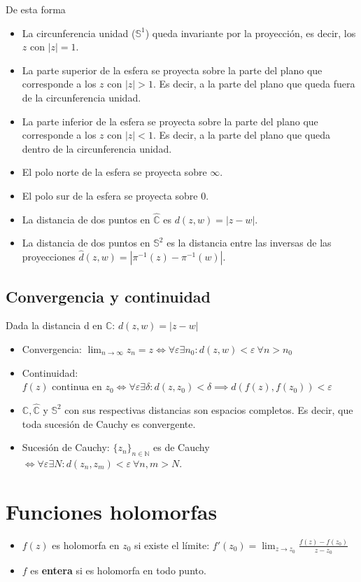 \documentclass[paper=a4, fontsize=11pt]{scrartcl}
\numberwithin{equation}{section}
\numberwithin{figure}{section}
\numberwithin{table}{section}
\begin{document}
De esta forma
\begin{itemize}
\item La circunferencia unidad ($\mathbb{S}^1$) queda invariante por la proyección, es decir, los $z$ con $|z|=1$.
\item La parte superior de la esfera se proyecta sobre la parte del plano que corresponde a los $z$ con $|z|>1$. Es decir, a la parte del plano que queda fuera de la circunferencia unidad.
\item La parte inferior de la esfera se proyecta sobre la parte del plano que corresponde a los $z$ con $|z|<1$. Es decir, a la parte del plano que queda dentro de la circunferencia unidad.
\item El polo norte de la esfera se proyecta sobre $\infty$.
\item El polo sur de la esfera se proyecta sobre $0$.
\item La distancia de dos puntos en $\hat{\mathbb{C}}$ es $d(z,w)=|z-w|$.
\item La distancia de dos puntos en $\mathbb{S}^2$ es la distancia entre las inversas de las proyecciones $\hat{d}(z,w)=|\pi^{-1}(z)-\pi^{-1}(w)|$.
\end{itemize}

\newpage
\subsection{Convergencia y continuidad}
Dada la distancia d en $\mathbb{C}$: $d(z,w)=|z-w|$
\begin{itemize}
\item Convergencia: $\boxed{\lim_{n\to\infty}{z_n}=z \iff \forall\varepsilon\exists n_0: d(z,w)<\varepsilon \ \forall n>n_0}$
\item Continuidad: $\boxed{f(z)\text{ continua en } z_0 \iff \forall \varepsilon \exists \delta: d(z,z_0)<\delta \implies d(f(z), f(z_0))<\varepsilon}$
\item $\mathbb{C}, \hat{\mathbb{C}}$ y $\mathbb{S}^2$ con sus respectivas distancias son espacios completos. Es decir, que toda sucesión de Cauchy es convergente.
\item Sucesión de Cauchy: $\{z_n\}_{n\in\mathbb{N}}$ es de Cauchy $\iff \forall\varepsilon \exists N: d(z_n,z_m)<\varepsilon\ \forall n,m > N$.
\end{itemize}

\newpage
\section{Funciones holomorfas}
\begin{itemize}
\item $f(z)$ es holomorfa en $z_0$ si existe el límite: $\boxed{f'(z_0) = \lim_{z\to z_0}\frac{f(z)-f(z_0)}{z-z_0}}$
\item $f$ es \textbf{entera} si es holomorfa en todo punto.
\end{itemize}
\end{document}
